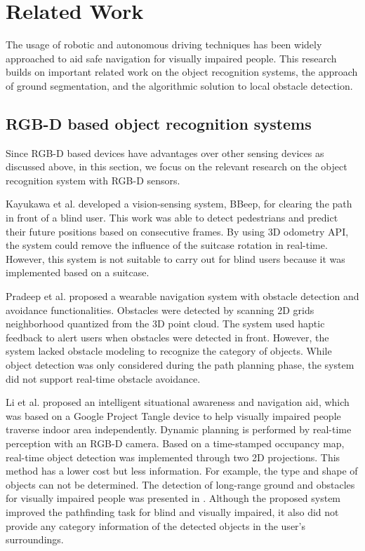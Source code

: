 \documentclass{ieeeaccess}
\begin{document}
\section{Related Work} \label{section:relatedwork}
The usage of robotic and autonomous driving techniques has been widely approached to aid safe navigation for visually impaired people. This research builds on important related work on the object recognition systems, the approach of ground segmentation, and the algorithmic solution to local obstacle detection.

\subsection{RGB-D based object recognition systems}
Since RGB-D based devices have advantages over other sensing devices as discussed above, in this section, we focus on the relevant research on the object recognition system with RGB-D sensors.   

Kayukawa et al. \cite{IEEEexample:kayukawa2019bbeep} developed a vision-sensing system, BBeep, for clearing the path in front of a blind user. This work was able to detect pedestrians and predict their future positions based on consecutive frames. By using 3D odometry API,  the system could remove the influence of the suitcase rotation in real-time. However, this system is not suitable to carry out for blind users because it was implemented based on a suitcase. 

Pradeep et al. \cite{IEEEexample:pradeep2010robot} proposed a wearable navigation system with obstacle detection and avoidance functionalities. Obstacles were detected by scanning 2D grids neighborhood quantized from the 3D point cloud. The system used haptic feedback to alert users when obstacles were detected in front. However, the system lacked obstacle modeling to recognize the category of objects. While object detection was only considered during the path planning phase, the system did not support real-time obstacle avoidance.

Li et al. \cite{IEEEexample:vision_based_mobile_indoor_nav_BingLi_2019} proposed an intelligent situational awareness and navigation aid, which was based on a Google Project Tangle device to help visually impaired people traverse indoor area independently. Dynamic planning is performed by real-time perception with an RGB-D camera. Based on a time-stamped occupancy map, real-time object detection was implemented through two 2D projections. This method has a lower cost but less information. For example, the type and shape of objects can not be determined. The detection of long-range ground and obstacles for visually impaired people was presented in \cite{IEEEexample:yang2018long}. Although the proposed system improved the pathfinding task for blind and visually impaired, it also did not provide any category information of the detected objects in the user’s surroundings.
\end{document}
